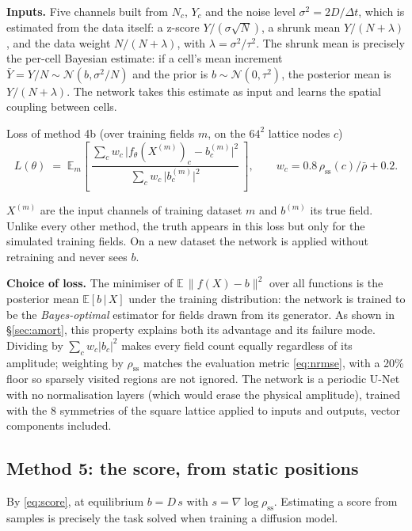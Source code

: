 \documentclass[11pt,a4paper]{article}
\newcommand{\dt}{\Delta t}
\newcommand{\E}{\mathbb{E}}
\newcommand{\rss}{\rho_{\mathrm{ss}}}
\begin{document}
\textbf{Inputs.} Five channels built from $N_c$, $Y_c$ and the noise level
$\sigma^2=2D/\dt$, which is estimated from the data itself: a z-score $Y/(\sigma\sqrt N)$, a
shrunk mean $Y/(N+\lambda)$, and the data weight $N/(N+\lambda)$, with $\lambda=\sigma^2/\tau^2$.
The shrunk mean is precisely the per-cell Bayesian estimate: if a cell's mean increment
$\bar Y=Y/N\sim\mathcal N(b,\sigma^2/N)$ and the prior is $b\sim\mathcal N(0,\tau^2)$, the
posterior mean is $Y/(N+\lambda)$. The network takes this estimate as input and learns the
spatial coupling between cells.

\begin{lossbox}{Loss of method 4b (over training fields $m$, on the $64^2$ lattice nodes $c$)}
\vspace{-0.4em}
\[
  L(\theta) \;=\; \E_m\left[\
  \frac{\sum_c w_c\,\big|f_\theta(X^{(m)})_c - b^{(m)}_c\big|^2}
       {\sum_c w_c\,\big|b^{(m)}_c\big|^2}\ \right],
  \qquad w_c = 0.8\,\rss(c)/\bar\rho + 0.2 .
\]
\vspace{-0.9em}

$X^{(m)}$ are the input channels of training dataset $m$ and $b^{(m)}$ its true field.
Unlike every other method, the truth appears in this loss \textemdash{} but only for the
simulated training fields. On a new dataset the network is applied without retraining
and never sees $b$.
\end{lossbox}

\textbf{Choice of loss.} The minimiser of $\E\,\|f(X)-b\|^2$ over all functions is the
posterior mean $\E[b\,|\,X]$ under the training distribution: the network is trained to be
the \emph{Bayes-optimal} estimator for fields drawn from its generator. As shown in
§\ref{sec:amort}, this property explains both its advantage and its failure mode. Dividing by
$\sum_c w_c|b_c|^2$ makes every field count equally regardless of its amplitude; weighting
by $\rss$ matches the evaluation metric \eqref{eq:nrmse}, with a 20\% floor so sparsely
visited regions are not ignored. The network is a periodic U-Net with no normalisation layers
(which would erase the physical amplitude), trained with the 8 symmetries of the square
lattice applied to inputs and outputs, vector components included.

\subsection{Method 5: the score, from static positions}

By \eqref{eq:score}, at equilibrium $b = D\,s$ with $s=\nabla\log\rss$. Estimating a score
from samples is precisely the task solved when training a diffusion model.
\end{document}
